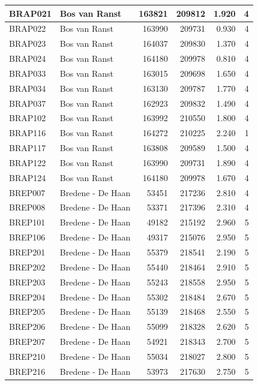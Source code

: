 \documentclass[11pt,]{book}
\begin{document}
\begin{table}
\begin{tabular}[t]{l|l|r|r|r|r}
\hline
BRAP021 & Bos van Ranst & 163821 & 209812 & 1.920 & 4\\
\hline
BRAP022 & Bos van Ranst & 163990 & 209731 & 0.930 & 4\\
\hline
BRAP023 & Bos van Ranst & 164037 & 209830 & 1.370 & 4\\
\hline
BRAP024 & Bos van Ranst & 164180 & 209978 & 0.810 & 4\\
\hline
BRAP033 & Bos van Ranst & 163015 & 209698 & 1.650 & 4\\
\hline
BRAP034 & Bos van Ranst & 163130 & 209787 & 1.770 & 4\\
\hline
BRAP037 & Bos van Ranst & 162923 & 209832 & 1.490 & 4\\
\hline
BRAP102 & Bos van Ranst & 163992 & 210550 & 1.800 & 4\\
\hline
BRAP116 & Bos van Ranst & 164272 & 210225 & 2.240 & 1\\
\hline
BRAP117 & Bos van Ranst & 163808 & 209589 & 1.500 & 4\\
\hline
BRAP122 & Bos van Ranst & 163990 & 209731 & 1.890 & 4\\
\hline
BRAP124 & Bos van Ranst & 164180 & 209978 & 1.670 & 4\\
\hline
BREP007 & Bredene - De Haan & 53451 & 217236 & 2.810 & 4\\
\hline
BREP008 & Bredene - De Haan & 53371 & 217396 & 2.310 & 4\\
\hline
BREP101 & Bredene - De Haan & 49182 & 215192 & 2.960 & 5\\
\hline
BREP106 & Bredene - De Haan & 49317 & 215076 & 2.950 & 5\\
\hline
BREP201 & Bredene - De Haan & 55379 & 218541 & 2.190 & 5\\
\hline
BREP202 & Bredene - De Haan & 55440 & 218464 & 2.910 & 5\\
\hline
BREP203 & Bredene - De Haan & 55243 & 218558 & 2.950 & 5\\
\hline
BREP204 & Bredene - De Haan & 55302 & 218484 & 2.670 & 5\\
\hline
BREP205 & Bredene - De Haan & 55139 & 218468 & 2.550 & 5\\
\hline
BREP206 & Bredene - De Haan & 55099 & 218328 & 2.620 & 5\\
\hline
BREP207 & Bredene - De Haan & 54921 & 218343 & 2.700 & 5\\
\hline
BREP210 & Bredene - De Haan & 55034 & 218027 & 2.800 & 5\\
\hline
BREP216 & Bredene - De Haan & 53973 & 217630 & 2.750 & 5\\

\end{tabular}
\end{table}
\end{document}
